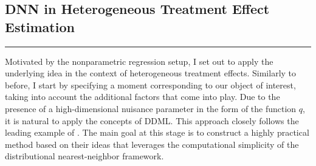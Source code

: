 \subsection{DNN in Heterogeneous Treatment Effect Estimation}
\hrule
Motivated by the nonparametric regression setup, I set out to apply the underlying idea in the context of heterogeneous treatment effects.
Similarly to before, I start by specifying a moment corresponding to our object of interest, taking into account the additional factors that come into play.
Due to the presence of a high-dimensional nuisance parameter in the form of the function $q$, it is natural to apply the concepts of DDML.
This approach closely follows the leading example of \citet{ritzwoller_simultaneous_2024}.
The main goal at this stage is to construct a highly practical method based on their ideas that leverages the computational simplicity of the distributional nearest-neighbor framework.\\

